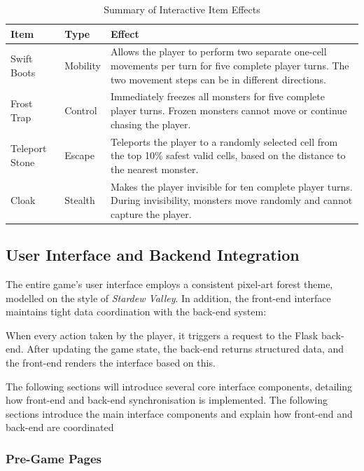 \documentclass[12pt,a4paper]{article}
\begin{document}
\begin{table}[H]
\centering
\caption{Summary of Interactive Item Effects}
\label{tab:item_effects}
\renewcommand{\arraystretch}{1.25}
\begin{tabular}{p{3cm} p{3cm} p{8cm}}
\toprule
\textbf{Item} & \textbf{Type} & \textbf{Effect} \\
\midrule
Swift Boots & Mobility & Allows the player to perform two separate one-cell movements per turn for five complete player turns. The two movement steps can be in different directions. \\
Frost Trap & Control & Immediately freezes all monsters for five complete player turns. Frozen monsters cannot move or continue chasing the player. \\
Teleport Stone & Escape & Teleports the player to a randomly selected cell from the top 10\% safest valid cells, based on the distance to the nearest monster. \\
Cloak & Stealth & Makes the player invisible for ten complete player turns. During invisibility, monsters move randomly and cannot capture the player. \\
\bottomrule
\end{tabular}
\end{table}


\subsection{User Interface and Backend Integration}

The entire game's user interface employs a consistent pixel-art forest theme, modelled on the style of \textit{Stardew Valley}. In addition, the front-end interface maintains tight data coordination with the back-end system:

When every action taken by the player, it triggers a request to the Flask back-end. After updating the game state, the back-end returns structured data, and the front-end renders the interface based on this.

The following sections will introduce several core interface components, detailing how front-end and back-end synchronisation is implemented. The following sections introduce the main interface components and explain how front-end and back-end are coordinated

\subsubsection{Pre-Game Pages}
\end{document}
